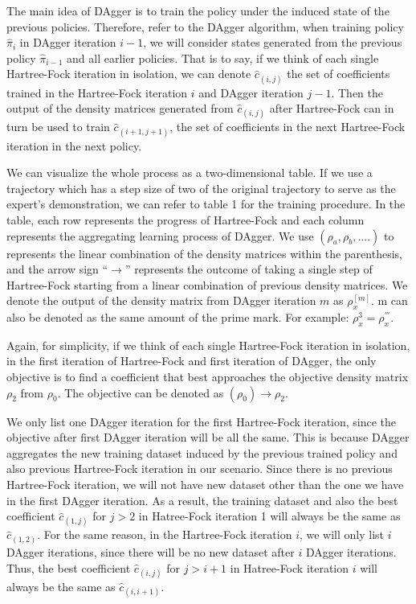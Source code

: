 \documentclass[twoside,11pt]{article}
\begin{document}
The main idea of DAgger is to train the policy under the induced state of the previous policies. Therefore, refer to the DAgger algorithm, when training policy $\hat{\pi}_{i}$ in DAgger iteration $i-1$,
we will consider states generated from the previous policy $\hat{\pi}_{i-1}$ and all earlier policies. That is to say, if we think of each single Hartree-Fock iteration in isolation, we can denote $\hat{c}_{(i,j)}$ the set of coefficients trained in the Hartree-Fock iteration $i$ and DAgger iteration $j-1$. Then the output of the density matrices generated from $\hat{c}_{(i,j)}$ after Hartree-Fock can in turn be used to train $\hat{c}_{(i+1,j+1)}$, the set of coefficients in the next Hartree-Fock iteration in the next policy.


We can visualize the whole process as a two-dimensional table. If we use a trajectory which has a step size of two of the original trajectory to serve as the expert's demonstration, we can refer to table 1 for the training procedure.
In the table, each row represents the progress of Hartree-Fock and each column represents the aggregating learning process of DAgger. We use $(\rho_a, \rho_b, ....)$ to represents the linear combination of the density matrices within the parenthesis, and the arrow sign ``$\rightarrow$'' represents the outcome of taking a single step of Hartree-Fock starting from a linear combination of previous density matrices. We denote the output of the density matrix from DAgger iteration $m$ as $\rho_x^{[m]}$. m can also be denoted as the same amount of the prime mark. For example: $\rho_x^{3} = \rho_x^{'''}$.

Again, for simplicity, if we think of each single Hartree-Fock iteration in isolation, in the first iteration of Hartree-Fock and first iteration of DAgger, the only objective is to find a coefficient that best approaches the objective density matrix $\rho_2$ from  $\rho_0$. The objective can be denoted as $(\rho_0) \rightarrow \rho_2$. 

We only list one DAgger iteration for the first Hartree-Fock iteration, since the objective after first DAgger iteration will be all the same. This is because DAgger aggregates the new training dataset induced by the previous trained policy and also previous Hartree-Fock iteration in our scenario. Since there is no previous Hartree-Fock iteration, we will not have new dataset other than the one we have in the first DAgger iteration. As a result, the training dataset and also the best coefficient $\hat{c}_{(1,j)}$ for $j>2$ in Hatree-Fock iteration 1 will always be the same as $\hat{c}_{(1,2)}$. For the same reason, in the Hartree-Fock iteration $i$, we will only list $i$ DAgger iterations, since there will be no new dataset after $i$ DAgger iterations. Thus, the best coefficient $\hat{c}_{(i,j)}$ for $j>i+1$ in Hatree-Fock iteration $i$ will always be the same as $\hat{c}_{(i,i+1)}$.
\end{document}
